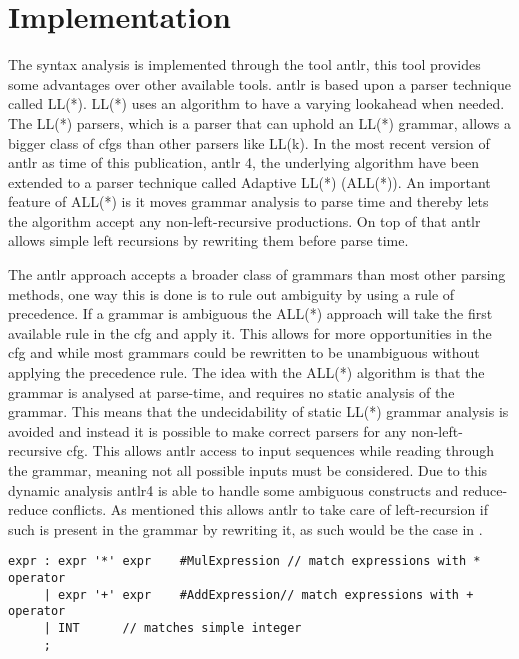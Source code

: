 
\section{Implementation}\label{sec:ANTLR}
The syntax analysis is implemented through the tool \acrfull{antlr}, this tool provides some advantages over other available tools.
\acrshort{antlr} is based upon a parser technique called LL(*).
LL(*) uses an algorithm to have a varying lookahead when needed.
The LL(*) parsers, which is a parser that can uphold an LL(*) grammar, allows a bigger class of \acrshort{cfg}s than other parsers like LL(k).
In the most recent version of \acrshort{antlr} as time of this publication, \acrshort{antlr} 4, the underlying algorithm have been extended to a parser technique called Adaptive LL(*) (ALL(*)).
An important feature of ALL(*) is it moves grammar analysis to parse time and thereby lets the algorithm accept any non-left-recursive productions.
On top of that \acrshort{antlr} allows simple left recursions by rewriting them before parse time.

The \acrshort{antlr} approach accepts a broader class of grammars than most other parsing methods, one way this is done is to rule out ambiguity by using a rule of precedence.
If a grammar is ambiguous the ALL(*) approach will take the first  available rule in the \acrshort{cfg} and apply it.
This allows for more opportunities in the \acrshort{cfg} and while most grammars could be rewritten to be unambiguous without applying the precedence rule.
The idea with the ALL(*) algorithm is that the grammar is analysed  at parse-time, and requires no static analysis of the grammar. 
This means that the undecidability of static LL(*) grammar analysis is avoided and instead it is possible to make correct parsers for any non-left-recursive \acrshort{cfg}.
This allows \acrshort{antlr} access to input sequences while reading through the grammar, meaning not all possible inputs must be considered.
Due to this dynamic analysis \acrshort{antlr}4 is able to handle some ambiguous constructs and reduce-reduce conflicts.
As mentioned this allows \acrshort{antlr} to take care of left-recursion if such is present in the grammar by rewriting it, as such would be the case in .

\begin{lstlisting}[caption=An ambiguous rule for expr,frame=tlrb,label={lst:amb}]
expr : expr '*' expr 	#MulExpression // match expressions with * operator
     | expr '+' expr 	#AddExpression// match expressions with + operator
     | INT 		// matches simple integer
     ;
\end{lstlisting}

